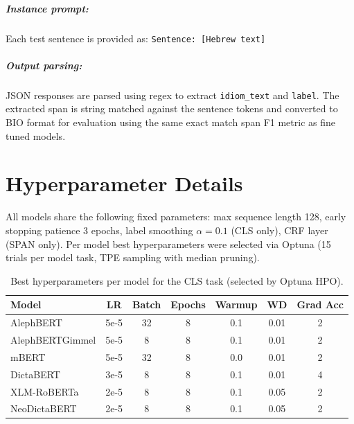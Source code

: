 \documentclass[11pt, a4paper]{report}
\begin{document}
\paragraph{Instance prompt:} Each test sentence is provided as: \texttt{Sentence: [Hebrew text]}

\paragraph{Output parsing:} JSON responses are parsed using regex to extract \texttt{idiom\_text} and \texttt{label}. The extracted span is string matched against the sentence tokens and converted to BIO format for evaluation using the same exact match span F1 metric as fine tuned models.

\chapter{Hyperparameter Details}
\label{sec:appendix_hpo}

All models share the following fixed parameters: max sequence length 128, early stopping patience 3 epochs, label smoothing $\alpha{=}0.1$ (CLS only), CRF layer (SPAN only). Per model best hyperparameters were selected via Optuna (15 trials per model task, TPE sampling with median pruning).

\begin{table}[H]
\centering
\small
\renewcommand{\arraystretch}{1.15}
\begin{tabularx}{\linewidth}{@{} X c c c c c c @{}}
\toprule
\textbf{Model} & \textbf{LR} & \textbf{Batch} & \textbf{Epochs} & \textbf{Warmup} & \textbf{WD} & \textbf{Grad Acc} \\
\midrule
AlephBERT & 5e-5 & 32 & 8 & 0.1 & 0.01 & 2 \\
AlephBERTGimmel & 5e-5 & 8 & 8 & 0.1 & 0.01 & 2 \\
mBERT & 5e-5 & 32 & 8 & 0.0 & 0.01 & 2 \\
DictaBERT & 3e-5 & 8 & 8 & 0.1 & 0.01 & 4 \\
XLM-RoBERTa & 2e-5 & 8 & 8 & 0.1 & 0.05 & 2 \\
NeoDictaBERT & 2e-5 & 8 & 8 & 0.1 & 0.05 & 2 \\
\bottomrule
\end{tabularx}
\caption{Best hyperparameters per model for the CLS task (selected by Optuna HPO).}
\label{tab:hyperparams_cls}
\end{table}
\end{document}
